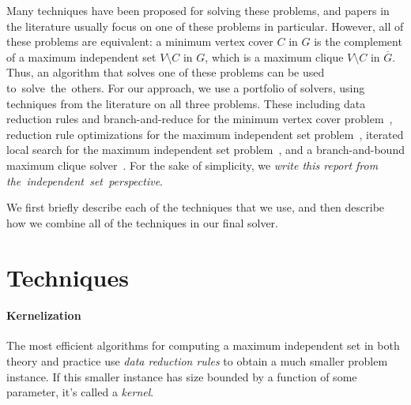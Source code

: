 \documentclass[a4paper,UKenglish]{lipics-v2016}
\begin{document}
Many techniques have been proposed for solving these problems, and papers in the literature usually focus on one of these problems in particular. However, all of these problems are equivalent: a
minimum vertex cover $C$ in $G$ is the complement of a maximum independent set $V\setminus C$ in $G$, which is a maximum clique $V\setminus C$ in $\overline{G}$. Thus, an algorithm that solves one of these problems can be used to~solve~the~others.
For our approach, we use a portfolio of solvers, using techniques from the literature on all three problems. These including data reduction rules and branch-and-reduce for the minimum vertex cover problem~\cite{akiba-tcs-2016}, reduction rule optimizations for the maximum independent set problem~\cite{chang2017computing,DBLP:conf/alenex/Hespe0S18}, iterated local search for the maximum independent set problem~\cite{DBLP:conf/wea/AndradeRW08}, and a branch-and-bound maximum clique solver~\cite{DBLP:journals/cor/LiJM17}.
For the sake of simplicity, we \emph{write this report from the~independent~set~perspective}. 

We first briefly describe each of the techniques that we use, and then describe how we combine all of the techniques in our final solver.
\section{Techniques}

\paragraph*{Kernelization}
The most efficient algorithms for computing a maximum independent set in both theory and practice use \emph{data reduction rules} to obtain a much smaller problem instance. If this smaller instance has size bounded by a function of some parameter, it's called a \emph{kernel}. 
\end{document}
